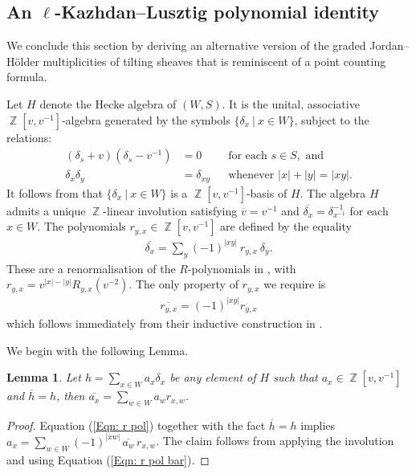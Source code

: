 \documentclass[11pt]{article}
\DeclareMathOperator{\Z}{\mathbb{Z}}
\newtheorem{lem}[thm]{Lemma}
\theoremstyle{remark}
\theoremstyle{definition}
\begin{document}
\subsection{An $\ell$-Kazhdan--Lusztig polynomial identity}\label{subsection:introduce r poly}
    We conclude this section by deriving an alternative version of the graded Jordan--H\"{o}lder multiplicities of tilting sheaves that is reminiscent of a point counting formula.
	\\
	\par 
	 Let $H$ denote the Hecke algebra of $(W,S)$. 
	It is the unital, associative $\Z[v,v^{-1}]$-algebra generated by the symbols $\{ \delta_x ~|~ x \in W \}$, subject to the relations:
	\begin{align*}
		(\delta_s+v)(\delta_s-v^{-1}) &=0 && \text{for each } s\in S, \text{ and}
		\\
		\delta_x \delta_y &= \delta_{xy} && \text{whenever } |x| + |y| = |xy|.
	\end{align*}
	It follows from \cite{Tits69} that $\{ \delta_x ~\vert~ x \in W\}$ is a $\Z[v,v^{-1}]$-basis of $H$.
	The algebra $H$ admits a unique $\Z$-linear involution satisfying $\overline{v} = v^{-1}$ and $\overline{\delta_x} = \delta_{x^{-1}}^{-1}$ for each $x \in W$.
	The polynomials $r_{y,x} \in \Z [v,v^{-1}]$ are defined by the equality
	\begin{align}
\label{Eqn: r pol}
		\overline{\delta_x} = \sum_y (-1)^{|xy|} ~r_{y,x}~ \delta_y. 
	\end{align}
	These are a renormalisation of the $R$-polynomials in \cite{KL79}, with $r_{y,x} = v^{|x| - |y|} R_{y,x}(v^{-2})$. 
	The only property of $r_{y,x}$ we require is
	\begin{align}
\label{Eqn: r pol bar}
		\overline{r_{y,x}} = (-1)^{|xy|} r_{y,x}
	\end{align}
	which follows immediately from their inductive construction in \cite[\S2.1(i)]{KL79}.
	\\
	\par 
	We begin with the following Lemma. 
	\begin{lem}
\label{Lem: r pol identity}
		Let $h = \sum_{x\in W} a_x \delta_x $ be any element of $H$ such that  $a_x \in \Z[v,v^{-1}]$ and $\overline{h}=h$,
		then $\overline{a_x} = \sum_{w \in W} a_w r_{x,w}$. 
	\end{lem}
	
	\begin{proof}
		Equation (\ref{Eqn: r pol}) together with the fact $\overline{h}=h$ implies $a_x = \sum_{w \in W} (-1)^{|xw|} \, \overline{a_w} \, r_{x,w}$. 
		The claim follows from applying the involution and using Equation (\ref{Eqn: r pol bar}). 
	\end{proof}
	
\end{document}
